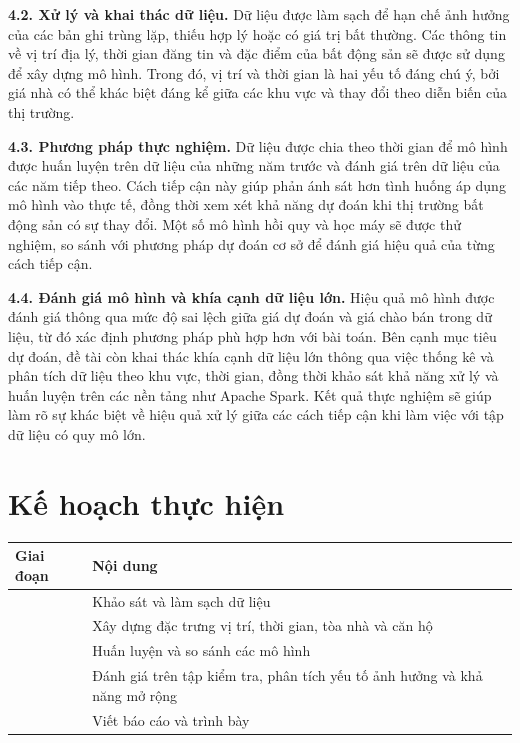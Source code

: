 \documentclass[12pt,a4paper]{article}
\newcommand{\hd}[1]{\textbf{#1}}
\begin{document}
\textbf{4.2. Xử lý và khai thác dữ liệu.} Dữ liệu được làm sạch để hạn chế ảnh hưởng của các bản ghi trùng lặp, thiếu hợp lý hoặc có giá trị bất thường. Các thông tin về vị trí địa lý, thời gian đăng tin và đặc điểm của bất động sản sẽ được sử dụng để xây dựng mô hình. Trong đó, vị trí và thời gian là hai yếu tố đáng chú ý, bởi giá nhà có thể khác biệt đáng kể giữa các khu vực và thay đổi theo diễn biến của thị trường.

\textbf{4.3. Phương pháp thực nghiệm.} Dữ liệu được chia theo thời gian để mô hình được huấn luyện trên dữ liệu của những năm trước và đánh giá trên dữ liệu của các năm tiếp theo. Cách tiếp cận này giúp phản ánh sát hơn tình huống áp dụng mô hình vào thực tế, đồng thời xem xét khả năng dự đoán khi thị trường bất động sản có sự thay đổi. Một số mô hình hồi quy và học máy sẽ được thử nghiệm, so sánh với phương pháp dự đoán cơ sở để đánh giá hiệu quả của từng cách tiếp cận.

\textbf{4.4. Đánh giá mô hình và khía cạnh dữ liệu lớn.} Hiệu quả mô hình được đánh giá thông qua mức độ sai lệch giữa giá dự đoán và giá chào bán trong dữ liệu, từ đó xác định phương pháp phù hợp hơn với bài toán. Bên cạnh mục tiêu dự đoán, đề tài còn khai thác khía cạnh dữ liệu lớn thông qua việc thống kê và phân tích dữ liệu theo khu vực, thời gian, đồng thời khảo sát khả năng xử lý và huấn luyện trên các nền tảng như Apache Spark. Kết quả thực nghiệm sẽ giúp làm rõ sự khác biệt về hiệu quả xử lý giữa các cách tiếp cận khi làm việc với tập dữ liệu có quy mô lớn.

\section{Kế hoạch thực hiện}
\begin{center}
\small
\begin{tabularx}{\textwidth}{|>{\centering\arraybackslash}p{2.1cm}|X|}
\hline
\rowcolor{gray!20} \hd{Giai đoạn} & \hd{Nội dung} \\ \hline
1 & Khảo sát và làm sạch dữ liệu \\ \hline
2 & Xây dựng đặc trưng vị trí, thời gian, tòa nhà và căn hộ \\ \hline
3 & Huấn luyện và so sánh các mô hình \\ \hline
4 & Đánh giá trên tập kiểm tra, phân tích yếu tố ảnh hưởng và khả năng mở rộng \\ \hline
5 & Viết báo cáo và trình bày \\ \hline
\end{tabularx}
\end{center}
\end{document}
